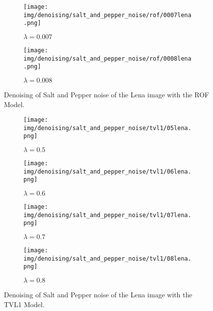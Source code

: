 \begin{figure}[ht]
    \centering
    \begin{subfigure}[b]{0.45\textwidth}
        \texttt{[image: img/denoising/salt\_and\_pepper\_noise/rof/0007lena.png]}
        \caption{$\lambda = 0.007$}
    \end{subfigure}
    \begin{subfigure}[b]{0.45\textwidth}
        \texttt{[image: img/denoising/salt\_and\_pepper\_noise/rof/0008lena.png]}
        \caption{$\lambda = 0.008$}
    \end{subfigure}
    \caption{Denoising of Salt and Pepper noise of the Lena image with the ROF Model.}
\label{fig:denoising_lena_rof_sap}
\end{figure}

\begin{figure}[ht]
    \centering
    \begin{subfigure}[b]{0.45\textwidth}
        \texttt{[image: img/denoising/salt\_and\_pepper\_noise/tvl1/05lena.png]}
        \caption{$\lambda = 0.5$}
    \end{subfigure}
    \begin{subfigure}[b]{0.45\textwidth}
        \texttt{[image: img/denoising/salt\_and\_pepper\_noise/tvl1/06lena.png]}
        \caption{$\lambda = 0.6$}
    \end{subfigure}
    \begin{subfigure}[b]{0.45\textwidth}
        \texttt{[image: img/denoising/salt\_and\_pepper\_noise/tvl1/07lena.png]}
        \caption{$\lambda = 0.7$}
    \end{subfigure}
    \begin{subfigure}[b]{0.45\textwidth}
        \texttt{[image: img/denoising/salt\_and\_pepper\_noise/tvl1/08lena.png]}
        \caption{$\lambda = 0.8$}
    \end{subfigure}
    \caption{Denoising of Salt and Pepper noise of the Lena image with the TVL1 Model.}
\label{fig:denoising_lena_tvl1_sap}
\end{figure}